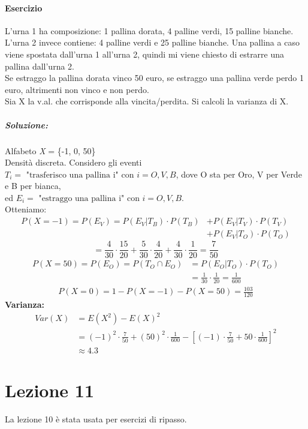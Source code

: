 \documentclass{report}
\begin{document}
\subsubsection{Esercizio}
L'urna 1 ha composizione: 1 pallina dorata, 4 palline verdi, 15 palline bianche. L'urna 2 invece contiene: 4 palline verdi e 25 palline bianche. Una pallina a caso viene spostata dall'urna 1 all'urna 2, quindi mi viene chiesto di estrarre una pallina dall'urna 2.\\
Se estraggo la pallina dorata vinco 50 euro, se estraggo una pallina verde perdo 1 euro, altrimenti non vinco e non perdo.\\
Sia X la v.al. che corrisponde alla vincita/perdita. Si calcoli la varianza di X.
\paragraph{Soluzione:} Alfabeto \textit{X} = \{-1, 0, 50\}\\
Densità discreta. Considero gli eventi \(T_i = \text{ "trasferisco una pallina i" con } i = O, V, B\), dove O sta per Oro, V per Verde e B per bianca,\\
ed \(E_i = \text{ "estraggo una pallina i" con } i = O,V,B\).\\
Otteniamo:
\begin{align}
    P(X=-1) = P(E_V) = P(E_V | T_B)\cdot P(T_B) & + P(E_V | T_V) \cdot P(T_V)\\ 
    & + P(E_V | T_O) \cdot P(T_O)
    \end{align}
    \[= \frac{4}{30}\cdot \frac{15}{20} + \frac{5}{30}\cdot \frac{4}{20} +\frac{4}{30}\cdot \frac{1}{20} = \frac{7}{50}\]
\begin{align}
    P(X = 50) = P(E_O) = P(T_O \cap E_O) & = P(E_O | T_O) \cdot P(T_O)\\
    & = \frac{1}{30} \cdot \frac{1}{20} = \frac{1}{600}
\end{align}
\begin{align}
    P(X = 0) = 1 - P(X = -1) - P(X = 50) = \frac{103}{120}
\end{align}
\textbf{Varianza:}
\begin{align}
    Var(X) &= E(X^2) - E(X)^2\\
    &= (-1)^2 \cdot \frac{7}{50} + (50)^2 \cdot \frac{1}{600} - [(-1) \cdot \frac{7}{50} + 50 \cdot \frac{1}{600}]^2\\
    &\approx 4.3
\end{align}

\chapter{Lezione 11}
La lezione 10 è stata usata per esercizi di ripasso.
\end{document}
